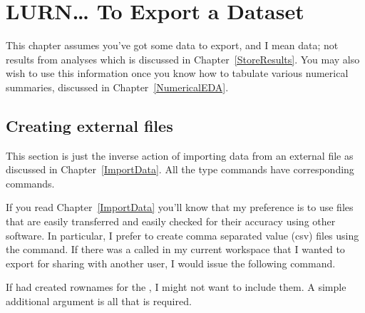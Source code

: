 

\chapter{LURN\ldots{} To Export a Dataset} 
\label{ExportData} 
 
 
This chapter assumes you've got some data to export, and I mean data; not results from analyses which is discussed in Chapter~\ref{StoreResults}. You may also wish to use this information once you know how to tabulate various numerical summaries, discussed in Chapter~\ref{NumericalEDA}. 
 
\section{Creating external files} 
 
This section is just the inverse action of importing data from an external file as discussed in Chapter~\ref{ImportData}. All the  type commands have corresponding  commands. 
 
If you read Chapter~\ref{ImportData} you'll know that my preference is to use files that are easily transferred and easily checked for their accuracy using other software. In particular, I prefer to create comma separated value (csv) files using the  command. If there was a  called  in my current workspace that I wanted to export for sharing with another user, I would issue the following command. 
\begin{knitrout}
\color{fgcolor}\begin{kframe}
\begin{alltt}
\hlstd{> } \hlstd{=}\hlstd{)}
\end{alltt}
\end{kframe}
\end{knitrout}
If \R{} had created rownames for the , I might not want to include them. A simple additional argument is all that is required. 
\begin{knitrout}
\color{fgcolor}\begin{kframe}
\begin{alltt}
\hlstd{> } \hlstd{=}\hlstd{,} \hlstd{=}\hlstd{)}
\end{alltt}
\end{kframe}
\end{knitrout}
 

